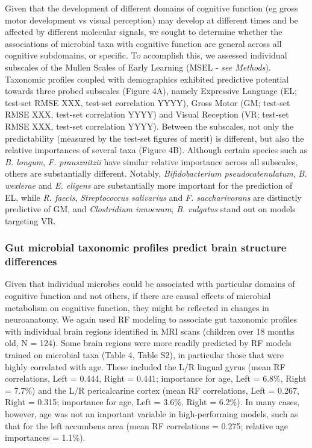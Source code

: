 \documentclass{article}
\begin{document}
Given that the development of different domains of cognitive function
(eg gross motor development vs visual perception) may develop at different times
and be affected by different molecular signals,
we sought to determine whether the associations of microbial taxa
with cognitive function are general across all cognitive subdomains,
or specific.
To accomplish this, we assessed individual subscales of the  
Mullen Scales of Early Learning (MSEL - \textit{see Methods}). 
Taxonomic profiles coupled with demographics exhibited predictive potential towards three probed subscales (Figure 4A), 
namely Expressive Language (EL; test-set RMSE XXX, test-set correlation YYYY), 
Gross Motor (GM; test-set RMSE XXX, test-set correlation YYYY) and 
Visual Reception (VR; test-set RMSE XXX, test-set correlation YYYY).
Between the subscales, not only the predictability (measured by the test-set figures of merit) is different,
but also the relative importances of several taxa (Figure 4B).
Although certain species such as \textit{B. longum}, \textit{F. prausznitzii} 
have similar relative importance across all subscales, others are substantially different.
Notably, \textit{Bifidobacterium pseudocatenulatum}, \textit{B. wexlerae} and \textit{E. eligens} are
substantially more important for the prediction of EL, while
\textit{R. faecis}, \textit{Streptococcus salivarius} and \textit{F. saccharivorans} are
distinctly predictive of GM, and
\textit{Clostridium innocuum}, \textit{B. vulgatus} 
stand out on models targeting VR.

\subsubsection*{Gut microbial taxonomic profiles predict brain structure differences}

Given that individual microbes could be associated with particular domains
of cognitive function and not others, if there are causal effects of microbial metabolism on cognitive
function, they might be reflected in changes in neuroanatomy. We again
used RF modeling to associate gut taxonomic
profiles with individual brain regions identified in MRI scans
(children over 18 months old, N = 124).
Some brain regions were more readily
predicted by RF models trained on microbial taxa (Table 4, Table S2), in particular those that were highly correlated with age.
These included the L/R lingual gyrus (mean RF correlations, Left =
0.444, Right = 0.441; importance for age, Left = 6.8\%, Right =
7.7\%) and the L/R pericalcarine cortex (mean RF correlations, Left =
0.267, Right = 0.315; importance for age, Left = 3.6\%, Right = 6.2\%).
In many cases, however, age was not an important variable in
high-performing models, such as that for the left accumbens area (mean
RF correlations = 0.275; relative age importances = 1.1\%).
\end{document}
